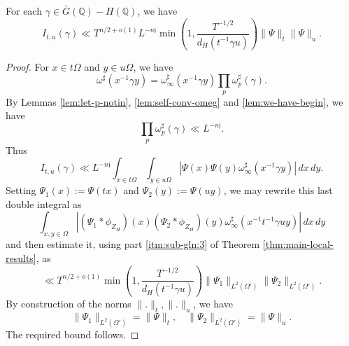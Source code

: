 \begin{lemma}\label{lem:sub-gln:each-gamma-in}
  For each $\gamma \in \bar{G}(\mathbb{Q}) - H(\mathbb{Q})$, we have
  \begin{equation*}
    I_{t, u}(\gamma) \ll T^{n/2 + o(1)} L^{-n \mathfrak{j}}
    \min \left( 1, \frac{T^{-1/2}}{d_H(t^{-1} \gamma u)} \right)
    \|\Psi \|_t \|\Psi \|_{u}.
  \end{equation*}
\end{lemma}
\begin{proof}
  For $x \in t \Omega$ and $y \in u \Omega$, we have
  \begin{equation*}
    \omega^\sharp (x^{-1} \gamma y)
    =
    \omega_\infty^\sharp (x^{-1} \gamma y)
    \prod_p \omega_p^\sharp (\gamma).
  \end{equation*}
  By Lemmas \ref{lem:let-p-notin}, \ref{lem:self-conv-omeg} and \ref{lem:we-have-begin}, we have
  \begin{equation*}
    \prod_p \omega_p^\sharp (\gamma) \ll L^{-n \mathfrak{j}}.
  \end{equation*}
  Thus
  \begin{equation*}
    I_{t, u}(\gamma) \ll L^{-n \mathfrak{j}} \int_{x \in t \Omega } \int_{y \in u \Omega } \left\lvert \Psi(x) \Psi(y)
      \omega_{\infty}^{\sharp}(x^{-1} \gamma y) \right\rvert \,d x \,d y.
  \end{equation*}
  Setting $\Psi_1(x) := \Psi(t x)$ and $\Psi_2(y) := \Psi(u y)$, we may rewrite this last double integral as
  \begin{equation*}
    \int_{x ,y \in \Omega } \left\lvert (\Psi_1 \ast \phi_{Z_H})(x) (\Psi_2 \ast \phi_{Z_H})(y) \omega_\infty^\sharp(x^{-1} t^{-1} \gamma u y) \right\rvert \,d x \,d y
  \end{equation*}
  and then estimate it, using part \eqref{itm:sub-gln:3} of Theorem \ref{thm:main-local-results}, as
  \begin{equation*}
    \ll
    T^{n/2 + o(1)}
    \min \left( 1, \frac{T^{-1/2}}{d_H(t^{-1} \gamma u)} \right)
    \|\Psi_1\|_{L^2(\Omega')}
    \|\Psi_2\|_{L^2(\Omega')}.
  \end{equation*}
  By construction of the norms $\|.\|_t, \|.\|_{u}$, we have
  \begin{equation*}
    \|\Psi_1\|_{L^2(\Omega ')} = \|\Psi\|_t, \quad
    \|\Psi_2\|_{L^2(\Omega ')} = \|\Psi\|_{u}.
  \end{equation*}
  The required bound follows.
\end{proof}

